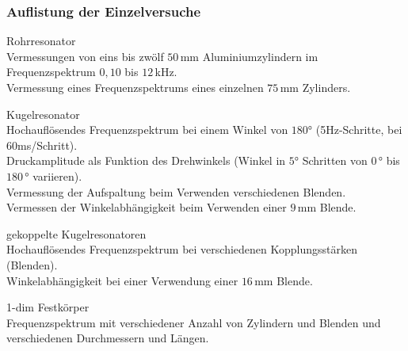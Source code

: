 \subsubsection*{Auflistung der Einzelversuche}
\begin{description}
    \item Rohrresonator\\
    Vermessungen von eins bis zwölf $50\,$mm Aluminiumzylindern im Frequenzspektrum $0,10$ bis $12\,$kHz.\\
    Vermessung eines Frequenzspektrums eines einzelnen $75\,$mm Zylinders.
    \item Kugelresonator\\
    Hochauflösendes Frequenzspektrum bei einem Winkel von $180°$ (5Hz-Schritte, bei 60ms/Schritt).\\
    Druckamplitude als Funktion des Drehwinkels (Winkel in $5°$ Schritten von $0\,°$ bis $180\,°$ variieren).\\
    Vermessung der Aufspaltung beim Verwenden verschiedenen Blenden.\\
    Vermessen der Winkelabhängigkeit beim Verwenden einer $9\,$mm Blende.
    \item gekoppelte Kugelresonatoren\\
    Hochauflösendes Frequenzspektrum bei verschiedenen Kopplungsstärken (Blenden).\\
    Winkelabhängigkeit bei einer Verwendung einer $16\,$mm Blende.\\
    \item 1-dim Festkörper\\
    Frequenzspektrum mit verschiedener Anzahl von Zylindern und Blenden und verschiedenen Durchmessern und Längen.\\
\end{description}

\label{sec:Durchfuehrung}
